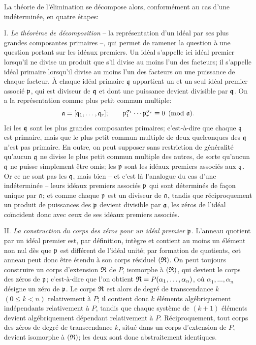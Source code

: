 La théorie de l'élimination se décompose alors, conformément au cas d'une indéterminée, en quatre étapes:

I. \emph{Le théorème de décomposition} -- la représentation d'un idéal par ses plus grandes composantes primaires --, qui permet de ramener la question à une question portant sur les idéaux premiers. Un idéal s'appelle ici idéal premier lorsqu'il ne divise un produit que s'il divise au moins l'un des facteurs; il s'appelle idéal primaire lorsqu'il divise au moins l'un des facteurs ou une puissance de chaque facteur. À chaque idéal primaire $\mathfrak q$ appartient un et un seul idéal premier associé $\mathfrak p$, qui est diviseur de $\mathfrak q$ et dont une puissance devient divisible par $\mathfrak q$. On a la représentation comme plus petit commun multiple:
\[
 \mathfrak a=[\mathfrak q_1,\ldots,\mathfrak q_r];\qquad
 \mathfrak p_1^{\sigma_1}\cdots \mathfrak p_r^{\sigma_r}\equiv 0\pmod{\mathfrak a}.
\]
Ici les $\mathfrak q$ sont les plus grandes composantes primaires; c'est-à-dire que chaque $\mathfrak q$ est primaire, mais que le plus petit commun multiple de deux quelconques des $\mathfrak q$ n'est pas primaire. En outre, on peut supposer sans restriction de généralité qu'aucun $\mathfrak q$ ne divise le plus petit commun multiple des autres, de sorte qu'aucun $\mathfrak q$ ne puisse simplement être omis; les $\mathfrak p$ sont les idéaux premiers associés aux $\mathfrak q$. Or ce ne sont pas les $\mathfrak q$, mais bien -- et c'est là l'analogue du cas d'une indéterminée -- leurs idéaux premiers associés $\mathfrak p$ qui sont déterminés de façon unique par $\mathfrak a$; et comme chaque $\mathfrak p$ est un diviseur de $\mathfrak a$, tandis que réciproquement un produit de puissances des $\mathfrak p$ devient divisible par $\mathfrak a$, les zéros de l'idéal coïncident donc avec ceux de ses idéaux premiers associés.

II. \emph{La construction du corps des zéros pour un idéal premier $\mathfrak p$.} L'anneau quotient par un idéal premier est, par définition, intègre et contient au moins un élément non nul dès que $\mathfrak p$ est différent de l'idéal unité; par formation de quotients, cet anneau peut donc être étendu à son corps résiduel $(\mathfrak R)$. On peut toujours construire un corps d'extension $\mathfrak R$ de $P$, isomorphe à $(\mathfrak R)$, qui devient le corps des zéros de $\mathfrak p$; c'est-à-dire que l'on obtient $\mathfrak R=P(\alpha_1,\ldots,\alpha_n)$, où $\alpha_1,\ldots,\alpha_n$ désigne un zéro de $\mathfrak p$. Le corps $\mathfrak R$ est alors de degré de transcendance $k$ $(0\leq k<n)$ relativement à $P$; il contient donc $k$ éléments algébriquement indépendants relativement à $P$, tandis que chaque système de $(k+1)$ éléments devient algébriquement dépendant relativement à $P$. Réciproquement, tout corps des zéros de degré de transcendance $k$, situé dans un corps d'extension de $P$, devient isomorphe à $(\mathfrak R)$; les deux sont donc abstraitement identiques.

